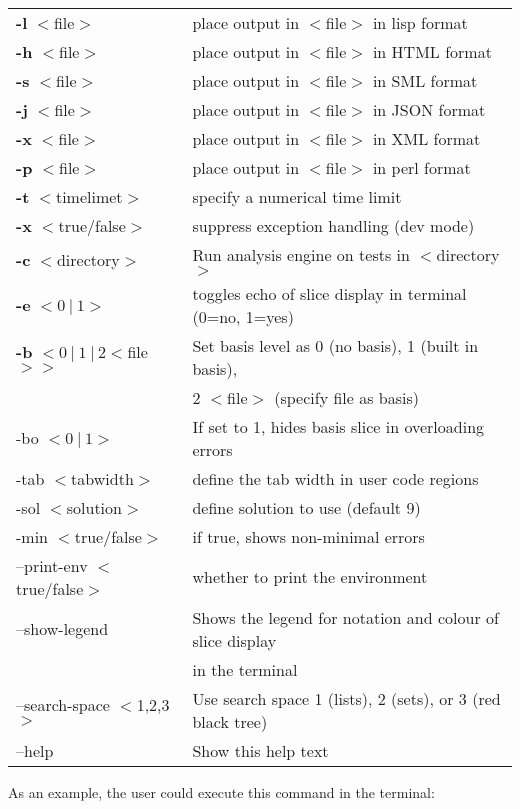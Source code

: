 \documentclass{report}
\begin{document}
\
\begin{tabular}{|l|l|}
\indent \textbf{-l} $<$file$>$ & place output in $<$file$>$ in lisp format\\
\indent \textbf{-h} $<$file$>$ & place output in $<$file$>$ in HTML format\\
\indent \textbf{-s} $<$file$>$ & place output in $<$file$>$ in SML format\\
\indent \textbf{-j} $<$file$>$ & place output in $<$file$>$ in JSON format\\
\indent \textbf{-x} $<$file$>$ & place output in $<$file$>$ in XML format\\
\indent \textbf{-p} $<$file$>$ & place output in $<$file$>$ in perl format\\
\indent \textbf{-t} $<$timelimet$>$ & specify a numerical time limit\\
\indent \textbf{-x} $<$true/false$>$ & suppress exception handling (dev mode)\\
\indent \textbf{-c} $<$directory$>$ & Run analysis engine on tests in $<$directory$>$\\
\indent \textbf{-e} $<0\ |\ 1>$ & toggles echo of slice display in terminal (0=no, 1=yes)\\
\indent \textbf{-b} $<0\ |\ 1\ |\ 2 <$file$> >$ & Set basis level as 0 (no basis), 1 (built in basis), \\&2 $<$file$>$ (specify file as basis)\\
\indent -bo $<0\ |\ 1>$ & If set to 1, hides basis slice in overloading errors\\
\indent -tab $<$tabwidth$>$ & define the tab width in user code regions\\
\indent -sol $<$solution$>$ & define solution to use (default 9)\\
\indent -min $<$true/false$>$ & if true, shows non-minimal errors\\
\indent --print-env $<$true/false$>$ & whether to print the environment\\
\indent --show-legend & Shows the legend for notation and colour of slice display\\&in the terminal\\
\indent --search-space $<$1,2,3$>$ & Use search space 1 (lists), 2 (sets), or 3 (red black tree)\\
\indent --help & Show this help text
\end{tabular}

As an example, the user could execute this command in the terminal:
\end{document}
